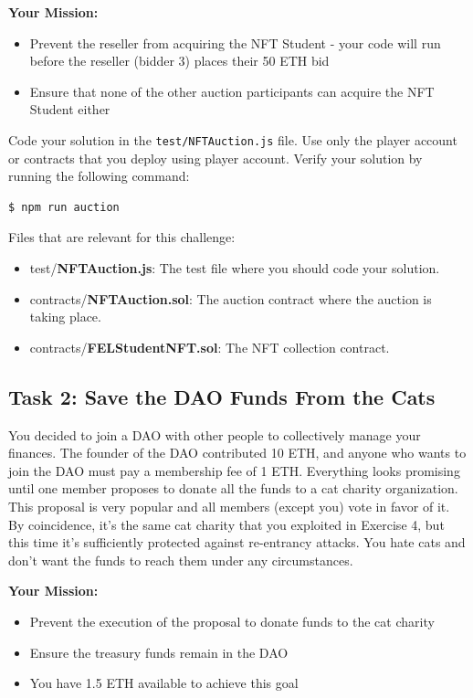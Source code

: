 \documentclass[12pt]{article}
\begin{document}
\medskip
\noindent
\textbf{Your Mission:}
\begin{itemize}
    \item Prevent the reseller from acquiring the NFT Student - your code will run before
          the reseller (bidder 3) places their 50 ETH bid
    \item Ensure that none of the other auction participants can acquire the NFT Student
          either
\end{itemize}

\noindent
Code your solution in the \texttt{test/NFTAuction.js} file. Use only the player account or contracts that you deploy using player account. Verify your solution by running the following command:

\begin{verbatim}
$ npm run auction
\end{verbatim}

\noindent
Files that are relevant for this challenge:
\begin{itemize}
    \item test/\textbf{NFTAuction.js}: The test file where you should code your solution.
    \item contracts/\textbf{NFTAuction.sol}: The auction contract where the auction is
          taking place.
    \item contracts/\textbf{FELStudentNFT.sol}: The NFT collection contract.
\end{itemize}

\subsection*{Task 2: Save the DAO Funds From the Cats}

You decided to join a DAO with other people to collectively manage your
finances. The founder of the DAO contributed 10 ETH, and anyone who wants to
join the DAO must pay a membership fee of 1 ETH. Everything looks promising
until one member proposes to donate all the funds to a cat charity
organization. This proposal is very popular and all members (except you) vote
in favor of it. By coincidence, it's the same cat charity that you exploited in
Exercise 4, but this time it's sufficiently protected against re-entrancy
attacks. You hate cats and don't want the funds to reach them under any
circumstances.

\medskip
\noindent
\textbf{Your Mission:}
\begin{itemize}
    \item Prevent the execution of the proposal to donate funds to the cat charity
    \item Ensure the treasury funds remain in the DAO
    \item You have 1.5 ETH available to achieve this goal
\end{itemize}
\end{document}
